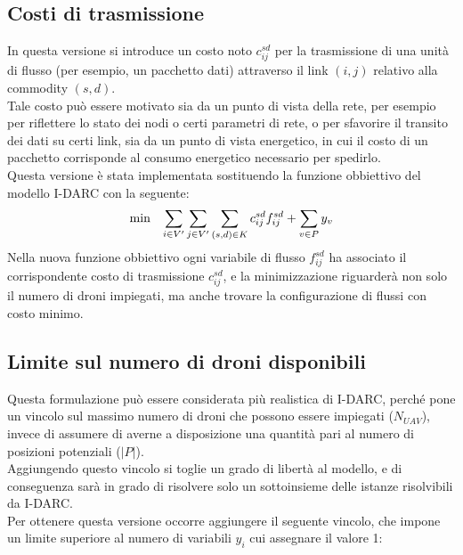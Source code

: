 \subsection{Costi di trasmissione}
In questa versione si introduce un costo noto $c_{ij}^{sd}$ per la trasmissione di una unità di flusso (per esempio, un pacchetto dati) attraverso il link $(i,j)$ relativo alla commodity $(s,d)$. \\
Tale costo può essere motivato sia da un punto di vista della rete, per esempio per riflettere lo stato dei nodi o certi parametri di rete, o per sfavorire il transito dei dati su certi link, sia da un punto di vista energetico, in cui il costo di un pacchetto corrisponde al consumo energetico necessario per spedirlo. \\
Questa versione è stata implementata sostituendo la funzione obbiettivo del modello I-DARC con la seguente: \\
%
\begin{equation*} \label{eq:costi}
	\begin{array}{rrclcl}
		\displaystyle \min & \multicolumn{3}{l}{\displaystyle \sum_{i \in V'} \displaystyle \sum_{j \in V'} \displaystyle \sum_{(s,d) \in K} c_{ij}^{sd} f_{ij}^{sd} + \displaystyle \sum_{v \in P} y_{v}} \\
	\end{array}
\end{equation*}
%
Nella nuova funzione obbiettivo ogni variabile di flusso $f_{ij}^{sd}$ ha associato il corrispondente costo di trasmissione $c_{ij}^{sd}$, e la minimizzazione riguarderà non solo il numero di droni impiegati, ma anche trovare la configurazione di flussi con costo minimo.

\subsection{Limite sul numero di droni disponibili}
Questa formulazione può essere considerata più realistica di I-DARC, perché pone un vincolo sul massimo numero di droni che possono essere impiegati ($N_{UAV}$), invece di assumere di averne a disposizione una quantità pari al numero di posizioni potenziali ($|P|$). \\
Aggiungendo questo vincolo si toglie un grado di libertà al modello, e di conseguenza sarà in grado di risolvere solo un sottoinsieme delle istanze risolvibili da I-DARC. \\
Per ottenere questa versione occorre aggiungere il seguente vincolo, che impone un limite superiore al numero di variabili $y_i$ cui assegnare il valore 1:

